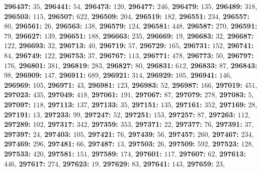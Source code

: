 \textsf{\bfseries 296437:} $35$, \textsf{\bfseries 296441:} $54$, \textsf{\bfseries 296473:} $120$, \textsf{\bfseries 296477:} $246$, \textsf{\bfseries 296479:} $135$, \textsf{\bfseries 296489:} $318$, \textsf{\bfseries 296503:} $115$, \textsf{\bfseries 296507:} $622$, \textsf{\bfseries 296509:} $204$, \textsf{\bfseries 296519:} $182$, \textsf{\bfseries 296551:} $234$, \textsf{\bfseries 296557:} $80$, \textsf{\bfseries 296561:} $26$, \textsf{\bfseries 296563:} $138$, \textsf{\bfseries 296579:} $124$, \textsf{\bfseries 296581:} $448$, \textsf{\bfseries 296587:} $270$, \textsf{\bfseries 296591:} $79$, \textsf{\bfseries 296627:} $139$, \textsf{\bfseries 296651:} $188$, \textsf{\bfseries 296663:} $235$, \textsf{\bfseries 296669:} $19$, \textsf{\bfseries 296683:} $32$, \textsf{\bfseries 296687:} $122$, \textsf{\bfseries 296693:} $32$, \textsf{\bfseries 296713:} $40$, \textsf{\bfseries 296719:} $57$, \textsf{\bfseries 296729:} $165$, \textsf{\bfseries 296731:} $152$, \textsf{\bfseries 296741:} $84$, \textsf{\bfseries 296749:} $122$, \textsf{\bfseries 296753:} $37$, \textsf{\bfseries 296767:} $113$, \textsf{\bfseries 296771:} $478$, \textsf{\bfseries 296773:} $50$, \textsf{\bfseries 296797:} $176$, \textsf{\bfseries 296801:} $381$, \textsf{\bfseries 296819:} $283$, \textsf{\bfseries 296827:} $80$, \textsf{\bfseries 296831:} $612$, \textsf{\bfseries 296833:} $87$, \textsf{\bfseries 296843:} $98$, \textsf{\bfseries 296909:} $147$, \textsf{\bfseries 296911:} $689$, \textsf{\bfseries 296921:} $314$, \textsf{\bfseries 296929:} $105$, \textsf{\bfseries 296941:} $146$, \textsf{\bfseries 296969:} $105$, \textsf{\bfseries 296971:} $43$, \textsf{\bfseries 296981:} $123$, \textsf{\bfseries 296983:} $52$, \textsf{\bfseries 296987:} $166$, \textsf{\bfseries 297019:} $451$, \textsf{\bfseries 297023:} $435$, \textsf{\bfseries 297049:} $418$, \textsf{\bfseries 297061:} $191$, \textsf{\bfseries 297067:} $87$, \textsf{\bfseries 297079:} $278$, \textsf{\bfseries 297083:} $5$, \textsf{\bfseries 297097:} $118$, \textsf{\bfseries 297113:} $137$, \textsf{\bfseries 297133:} $35$, \textsf{\bfseries 297151:} $135$, \textsf{\bfseries 297161:} $352$, \textsf{\bfseries 297169:} $28$, \textsf{\bfseries 297191:} $13$, \textsf{\bfseries 297233:} $99$, \textsf{\bfseries 297247:} $52$, \textsf{\bfseries 297251:} $153$, \textsf{\bfseries 297257:} $87$, \textsf{\bfseries 297263:} $112$, \textsf{\bfseries 297289:} $102$, \textsf{\bfseries 297317:} $342$, \textsf{\bfseries 297359:} $353$, \textsf{\bfseries 297371:} $22$, \textsf{\bfseries 297377:} $76$, \textsf{\bfseries 297391:} $37$, \textsf{\bfseries 297397:} $24$, \textsf{\bfseries 297403:} $105$, \textsf{\bfseries 297421:} $76$, \textsf{\bfseries 297439:} $56$, \textsf{\bfseries 297457:} $260$, \textsf{\bfseries 297467:} $234$, \textsf{\bfseries 297469:} $296$, \textsf{\bfseries 297481:} $66$, \textsf{\bfseries 297487:} $13$, \textsf{\bfseries 297503:} $26$, \textsf{\bfseries 297509:} $592$, \textsf{\bfseries 297523:} $128$, \textsf{\bfseries 297533:} $420$, \textsf{\bfseries 297581:} $151$, \textsf{\bfseries 297589:} $174$, \textsf{\bfseries 297601:} $117$, \textsf{\bfseries 297607:} $62$, \textsf{\bfseries 297613:} $446$, \textsf{\bfseries 297617:} $274$, \textsf{\bfseries 297623:} $19$, \textsf{\bfseries 297629:} $83$, \textsf{\bfseries 297641:} $143$, \textsf{\bfseries 297659:} $23$, 
